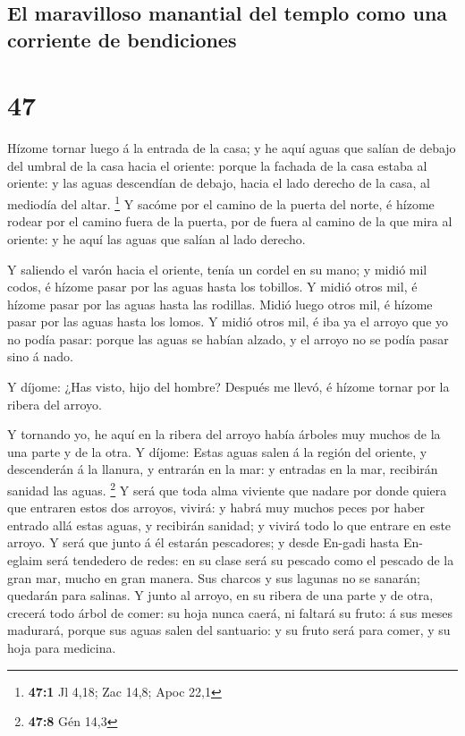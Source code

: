 \hypertarget{el-maravilloso-manantial-del-templo-como-una-corriente-de-bendiciones}{%
\subsection{El maravilloso manantial del templo como una corriente de
bendiciones}\label{el-maravilloso-manantial-del-templo-como-una-corriente-de-bendiciones}}

\hypertarget{section-46}{%
\section{47}\label{section-46}}

 Hízome tornar luego á la entrada de la casa; y he aquí
aguas que salían de debajo del umbral de la casa hacia el oriente:
porque la fachada de la casa estaba al oriente: y las aguas descendían
de debajo, hacia el lado derecho de la casa, al mediodía del altar.
\footnote{\textbf{47:1} Jl 4,18; Zac 14,8; Apoc 22,1}  Y
sacóme por el camino de la puerta del norte, é hízome rodear por el
camino fuera de la puerta, por de fuera al camino de la que mira al
oriente: y he aquí las aguas que salían al lado derecho.

 Y saliendo el varón hacia el oriente, tenía un cordel en su
mano; y midió mil codos, é hízome pasar por las aguas hasta los
tobillos.  Y midió otros mil, é hízome pasar por las aguas
hasta las rodillas. Midió luego otros mil, é hízome pasar por las aguas
hasta los lomos.  Y midió otros mil, é iba ya el arroyo que
yo no podía pasar: porque las aguas se habían alzado, y el arroyo no se
podía pasar sino á nado.

 Y díjome: ¿Has visto, hijo del hombre? Después me llevó, é
hízome tornar por la ribera del arroyo.

 Y tornando yo, he aquí en la ribera del arroyo había
árboles muy muchos de la una parte y de la otra.  Y díjome:
Estas aguas salen á la región del oriente, y descenderán á la llanura, y
entrarán en la mar: y entradas en la mar, recibirán sanidad las aguas.
\footnote{\textbf{47:8} Gén 14,3}  Y será que toda alma
viviente que nadare por donde quiera que entraren estos dos arroyos,
vivirá: y habrá muy muchos peces por haber entrado allá estas aguas, y
recibirán sanidad; y vivirá todo lo que entrare en este arroyo.
 Y será que junto á él estarán pescadores; y desde En-gadi
hasta En-eglaim será tendedero de redes: en su clase será su pescado
como el pescado de la gran mar, mucho en gran manera.  Sus
charcos y sus lagunas no se sanarán; quedarán para salinas.
 Y junto al arroyo, en su ribera de una parte y de otra,
crecerá todo árbol de comer: su hoja nunca caerá, ni faltará su fruto: á
sus meses madurará, porque sus aguas salen del santuario: y su fruto
será para comer, y su hoja para medicina.

